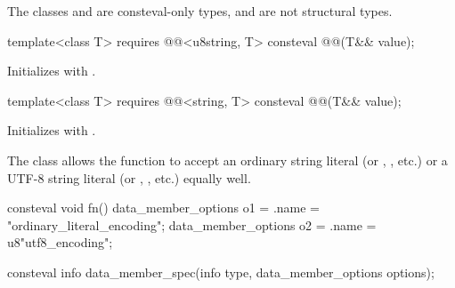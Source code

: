 \pnum
The classes 
and 
are consteval-only types,
and are not structural types.

\begin{itemdecl}
template<class T>
  requires @@<u8string, T>
  consteval @@(T&& value);
\end{itemdecl}

\begin{itemdescr}
\pnum
\effects
Initializes 
with .
\end{itemdescr}

\begin{itemdecl}
template<class T>
  requires @@<string, T>
  consteval @@(T&& value);
\end{itemdecl}

\begin{itemdescr}
\pnum
\effects
Initializes 
with .
\begin{note}
The class  allows
the function  to accept
an ordinary string literal (or , , etc.)
or a UTF-8 string literal (or , , etc.)
equally well.
\begin{example}
\begin{codeblock}
consteval void fn() {
  data_member_options o1 = {.name = "ordinary_literal_encoding"};
  data_member_options o2 = {.name = u8"utf8_encoding"};
}
\end{codeblock}
\end{example}
\end{note}
\end{itemdescr}

%
\begin{itemdecl}
consteval info data_member_spec(info type, data_member_options options);
\end{itemdecl}

